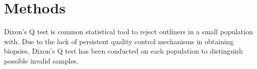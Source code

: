 \chapter{Methods}

Dixon's Q test is common statistical tool to reject outliners in a small population with. Due to the lack of persistent quality control mechanisms in obtaining biopsies, Dixon's Q test has been conducted on each population to distinguish possible invalid samples. 